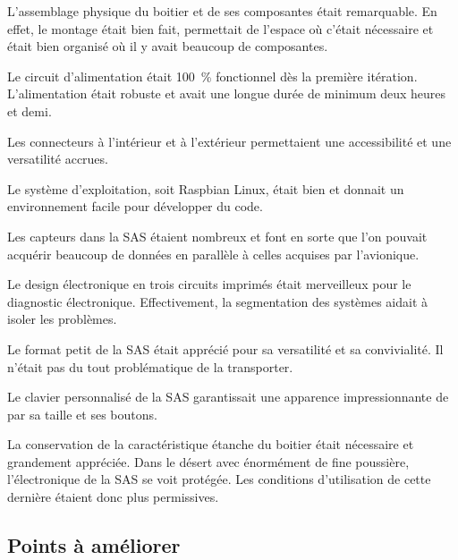 L’assemblage physique du boitier et de ses composantes était remarquable.
En effet, le montage était bien fait, permettait de l’espace où c’était
nécessaire et était bien organisé où il y avait beaucoup de composantes.
\par
Le circuit d’alimentation était 100~\% fonctionnel dès la première itération.
L’alimentation était robuste et avait une longue durée de minimum deux heures
et demi.
\par
Les connecteurs à l’intérieur et à l’extérieur permettaient une accessibilité
et une versatilité accrues.
\par
Le système d’exploitation, soit Raspbian Linux, était bien et donnait un
environnement facile pour développer du code.
\par
Les capteurs dans la SAS étaient nombreux et font en sorte que l’on pouvait
acquérir beaucoup de données en parallèle à celles acquises par l’avionique.
\par
Le design électronique en trois circuits imprimés était merveilleux pour le
diagnostic électronique. Effectivement, la segmentation des systèmes aidait à
isoler les problèmes.
\par
Le format petit de la SAS était apprécié pour sa versatilité et sa
convivialité. Il n’était pas du tout problématique de la transporter.
\par
Le clavier personnalisé de la SAS garantissait une apparence impressionnante de
par sa taille et ses boutons.
\par
La conservation de la caractéristique étanche du boitier était nécessaire et
grandement appréciée. Dans le désert avec énormément de fine poussière,
l’électronique de la SAS se voit protégée. Les conditions d’utilisation de
cette dernière étaient donc plus permissives.

\subsection{Points à améliorer}

